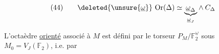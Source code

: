 \[
(44)\qquad
\deleted{\unsure{\underline\omega}}\ \mathrm{Or}(\Delta)
\simeq
\underset{\underline\omega_J}{\underbrace{\underline\omega_\Delta}}\wedge C_\Delta
\]

L'octaèdre \uline{orienté} \inserted{$\Delta^+$} associé à $M$ est défini par le torseur $P_M/\mathbb{F}_2^{\underline\omega}$ sous $M_0=V_J(\mathbb{F}_2)$, i.e. par
